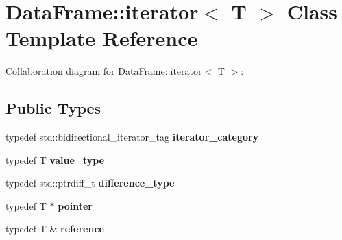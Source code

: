 \hypertarget{classDataFrame_1_1iterator}{}\section{Data\+Frame\+:\+:iterator$<$ T $>$ Class Template Reference}
\label{classDataFrame_1_1iterator}


Collaboration diagram for Data\+Frame\+:\+:iterator$<$ T $>$\+:
\subsection*{Public Types}
\begin{DoxyCompactItemize}
\item 
\mbox{\label{classDataFrame_1_1iterator_ab72b480713010aa587b24a65660faec7}} 
typedef std\+::bidirectional\+\_\+iterator\+\_\+tag {\bfseries iterator\+\_\+category}
\item 
\mbox{\label{classDataFrame_1_1iterator_a4590d331b7a7cbb7037fd6e0cd9e2bd3}} 
typedef T {\bfseries value\+\_\+type}
\item 
\mbox{\label{classDataFrame_1_1iterator_a5268259f062c85e6a0630600d79c8c4f}} 
typedef std\+::ptrdiff\+\_\+t {\bfseries difference\+\_\+type}
\item 
\mbox{\label{classDataFrame_1_1iterator_ae31b1f442558e777d9b5a88e740e0309}} 
typedef T $\ast$ {\bfseries pointer}
\item 
\mbox{\label{classDataFrame_1_1iterator_aa62587b9a0a1a2c5ff79a573a92ddbbf}} 
typedef T \& {\bfseries reference}
\end{DoxyCompactItemize}
